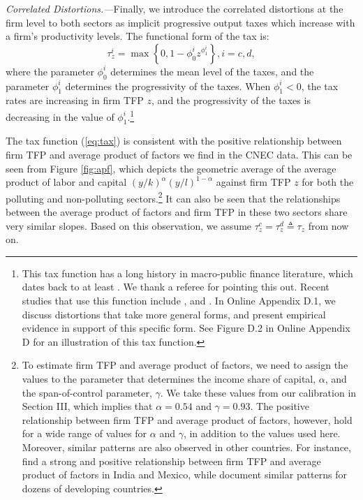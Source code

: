 \documentclass[AEJ]{AEA}
\begin{document}
\textit{Correlated Distortions.---}Finally, we introduce the correlated distortions at the firm level to both sectors as implicit progressive output taxes which increase with a firm's productivity levels. The functional form of the tax is:
\begin{equation}
    \tau^i_z = \max \left\{ 0, 1 - \phi_0^i z^{\phi_1^i} \right\}, i=c,d,
\label{eq:tax}
\end{equation}
where the parameter $\phi_0^i$ determines the mean level of the taxes, and the parameter $\phi_1^i$ determines the progressivity of the taxes. When $\phi_1^i<0$, the tax rates are increasing in firm TFP $z$, and the progressivity of the taxes is decreasing in the value of $\phi_1^i$.\footnote{This tax function has a long history in macro-public finance literature, which dates back to at least \citet{Benabou:2002}. We thank a referee for pointing this out. Recent studies that use this function include \citet{HsiehKlenow:2014}, \citet{BentoRestuccia:2016} and \citet{Guneretal:2017}. In Online Appendix D.1, we discuss distortions that take more general forms, and present empirical evidence in support of this specific form. See Figure D.2 in Online Appendix D for an illustration of this tax function.}

The tax function (\ref{eq:tax}) is consistent with the positive relationship between firm TFP and average product of factors we find in the CNEC data. This can be seen from Figure \ref{fig:apf}, which depicts the geometric average of the average product of labor and capital $(y/k)^\alpha(y/l)^{1-\alpha}$ against firm TFP $z$ for both the polluting and non-polluting sectors.\footnote{To estimate firm TFP and average product of factors, we need to assign the values to the parameter that determines the income share of capital, $\alpha$, and the span-of-control parameter, $\gamma$. We take these values from our calibration in Section III, which implies that $\alpha = \text{0.54}$ and $\gamma = \text{0.93}$. The positive relationship between firm TFP and average product of factors, however, hold for a wide range of values for $\alpha$ and $\gamma$, in addition to the values used here. Moreover, similar patterns are also observed in other countries. For instance, \citet{HsiehKlenow:2014} find a strong and positive relationship between firm TFP and average product of factors in India and Mexico, while \citet{BentoRestuccia:2016} document similar patterns for dozens of developing countries.} It can also be seen that the relationships between the average product of factors and firm TFP in these two sectors share very similar slopes. Based on this observation, we assume $\tau^c_z = \tau^d_z \triangleq \tau_z$ from now on.
\end{document}
